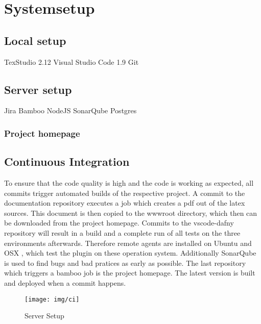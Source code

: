 \section{Systemsetup}
\subsection{Local setup}
TexStudio 2.12\newline
Visual Studio Code 1.9\newline
Git 


\subsection{Server setup}
Jira \newline
Bamboo\newline
NodeJS\newline
SonarQube\newline
Postgres

\subsubsection{Project homepage}

\subsection{Continuous Integration}

To ensure that the code quality is high and the code is working as expected, all commits trigger automated builds of the respective project. A commit to the documentation repository executes a job which creates a pdf out of the latex sources. This document is then copied to the wwwroot directory, which then can be downloaded from the project homepage. Commits to the vscode-dafny repository will result in a build and a complete run of all tests on the three environments afterwards. Therefore remote agents are installed on Ubuntu and OSX , which test the plugin on these operation system.  Additionally SonarQube is used to find bugs and bad pratices as early as possible. The last repository which triggers a bamboo job is the project homepage. The latest version is built and deployed when a commit happens. 


\begin{figure}[H]
	\centering
	\texttt{[image: img/ci]}
	\caption{Server Setup}
	\label{fig:Server setup}
\end{figure}